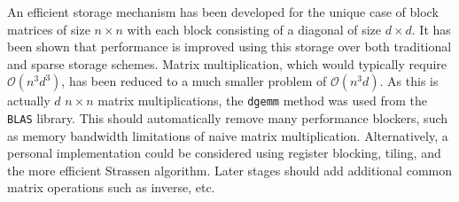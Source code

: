 \documentclass[letterpaper, 10pt, twoside]{article}
\begin{document}
	An efficient storage mechanism has been developed for the unique case of block matrices of size $n\times n$ with each block consisting of a diagonal of size $d\times d$. It has been shown that performance is improved using this storage over both traditional and sparse storage schemes. Matrix multiplication, which would typically require $\mathcal{O}(n^3d^3)$, has been reduced to a much smaller problem of $\mathcal{O}(n^3d)$. As this is actually $d$ $n\times n$ matrix multiplications, the \texttt{dgemm} method was used from the \texttt{BLAS} library. This should automatically remove many performance blockers, such as memory bandwidth limitations of naive matrix multiplication. Alternatively, a personal implementation could be considered using register blocking, tiling, and the more efficient Strassen algorithm. Later stages should add additional common matrix operations such as inverse, etc.
	
	
\end{document}
